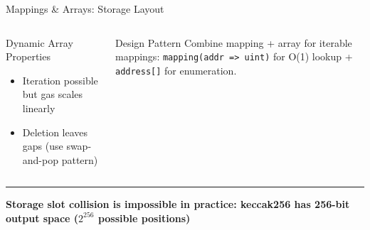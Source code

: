 \documentclass[8pt,aspectratio=169]{beamer}
\newcommand{\bottomnote}[1]{\vfill\vspace{-2mm}\textcolor{mllavender2}{\rule{\textwidth}{0.4pt}}\vspace{1mm}\footnotesize\textbf{#1}}
\begin{document}
\begin{frame}{Mappings \& Arrays: Storage Layout}
\begin{columns}
\begin{block}{Dynamic Array Properties}
\begin{itemize}
  \item Iteration possible but gas scales linearly
  \item Deletion leaves gaps (use swap-and-pop pattern)
\end{itemize}
\end{block}
\vspace{2mm}
\begin{alertblock}{Design Pattern}
\small Combine mapping + array for iterable mappings: \texttt{mapping(addr => uint)} for O(1) lookup + \texttt{address[]} for enumeration.
\end{alertblock}
\end{columns}
\bottomnote{Storage slot collision is impossible in practice: keccak256 has 256-bit output space ($2^{256}$ possible positions)}
\end{frame}
\end{document}

